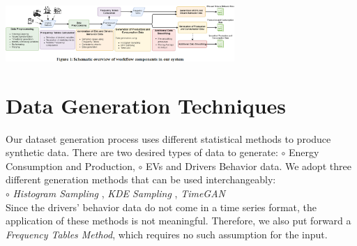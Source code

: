 \documentclass{article}
\begin{document}
\begin{multicols}{3}
\includegraphics[width=0.65\textwidth]{figures/overview.png}

\vspace{-1.5cm}
\section*{Data Generation Techniques}
\vspace{-0.5cm}
Our dataset generation process uses different statistical methods to produce synthetic data.
There are two desired types of data to generate: 
\hspace{0.1cm}$\circ$ Energy Consumption and Production, 
\hspace{0.1cm}$\circ$ EVs and Drivers Behavior data. 
We adopt three different generation methods that can be used interchangeably:\\
\indent \hspace{0.1cm}$\circ$ {\em Histogram Sampling} , {\em KDE Sampling} , {\em TimeGAN}\\
Since the drivers' 
behavior data %
do not come in a time series format, the application of these methods is not meaningful. Therefore, we also put forward a {\em Frequency Tables Method}, which requires no such assumption for the input. 

\vspace{-1.2cm}

\end{multicols}
\end{document}
